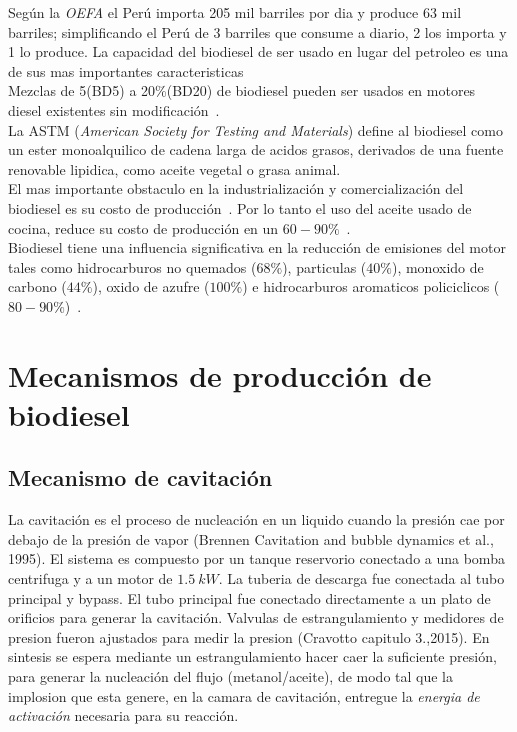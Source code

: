 \documentclass[a4paper,10pt]{article}
\begin{document}
Según la \emph{OEFA} el Perú importa 205 mil barriles por dia y produce 63 mil barriles; simplificando el Perú de 3 barriles que consume a diario, 2 los importa y 1 lo produce.
La capacidad del biodiesel de ser usado en lugar del petroleo es una de sus mas importantes caracteristicas~\cite{geyer1984} \\
Mezclas de 5(BD5) a 20\%(BD20) de biodiesel pueden ser usados en motores diesel existentes sin modificación~\cite{Ghorbani2011}.\\
La ASTM (\emph{American Society for Testing and Materials}) define al biodiesel como un ester monoalquilico de cadena larga de acidos grasos, derivados de una fuente renovable lipidica, como aceite vegetal o grasa animal.\\
El mas importante obstaculo en la industrialización y comercialización del biodiesel es su costo de producción~\cite{talebian2013,demirbas2009}. Por lo tanto el uso del aceite usado de cocina, reduce su costo de producción en un $60-90\%$~\cite{talebian2013,canakci1998}. \\
Biodiesel tiene una influencia significativa en la reducción de emisiones del motor tales como hidrocarburos no quemados ($68\%$), particulas ($40\%$), monoxido de carbono ($44\%$), oxido de azufre ($100\%$) e hidrocarburos aromaticos policiclicos ($80-90\%$)~\cite{talebian2013,leduc2009}.

\section{Mecanismos de producción de biodiesel}

\subsection{Mecanismo de cavitación}
La cavitación es el proceso de nucleación en un liquido cuando la presión cae por debajo de la presión de vapor (Brennen Cavitation and bubble dynamics et al., 1995).
El sistema es compuesto por un tanque reservorio conectado a una bomba centrifuga y a un motor de $1.5\:kW$. La tuberia de descarga fue conectada al tubo principal y  bypass. El tubo principal fue conectado directamente a un plato de orificios para generar la cavitación. Valvulas de estrangulamiento y medidores de presion fueron ajustados para medir la presion (Cravotto capitulo 3.,2015). En sintesis se espera mediante un estrangulamiento hacer caer la suficiente presión, para generar la nucleación del flujo (metanol/aceite), de modo tal que la implosion que esta genere, en la camara de cavitación, entregue la \emph{energia de activación} necesaria para su reacción.
\end{document}
